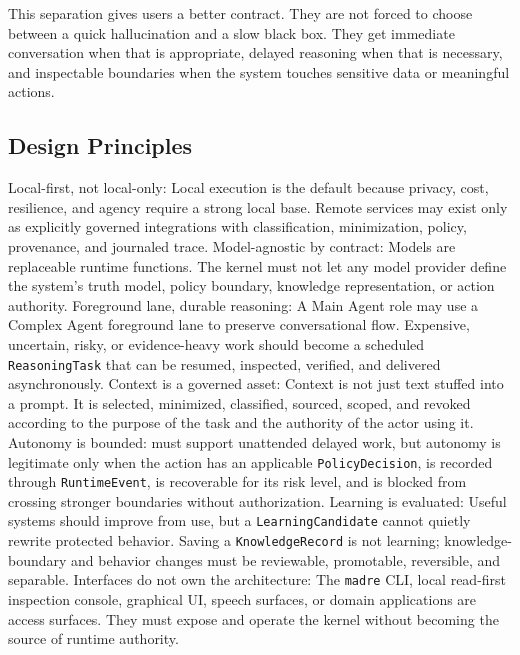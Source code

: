 \documentclass[11pt]{report}
\begin{document}
This separation gives users a better contract. They are not forced to choose between a quick hallucination and a slow black box. They get immediate conversation when that is appropriate, delayed reasoning when that is necessary, and inspectable boundaries when the system touches sensitive data or meaningful actions.

\subsection{Design Principles}

\begin{itemize}
	\itembf Local-first, not local-only: Local execution is the default because privacy, cost, resilience, and agency require a strong local base. Remote services may exist only as explicitly governed integrations with classification, minimization, policy, provenance, and journaled trace.
	\itembf Model-agnostic by contract: Models are replaceable runtime functions. The kernel must not let any model provider define the system's truth model, policy boundary, knowledge representation, or action authority.
	\itembf Foreground lane, durable reasoning: A Main Agent role may use a Complex Agent foreground lane to preserve conversational flow. Expensive, uncertain, risky, or evidence-heavy work should become a scheduled \texttt{ReasoningTask} that can be resumed, inspected, verified, and delivered asynchronously.
	\itembf Context is a governed asset: Context is not just text stuffed into a prompt. It is selected, minimized, classified, sourced, scoped, and revoked according to the purpose of the task and the authority of the actor using it.
	\itembf Autonomy is bounded: \Madre must support unattended delayed work, but autonomy is legitimate only when the action has an applicable \texttt{PolicyDecision}, is recorded through \texttt{RuntimeEvent}, is recoverable for its risk level, and is blocked from crossing stronger boundaries without authorization.
	\itembf Learning is evaluated: Useful systems should improve from use, but a \texttt{LearningCandidate} cannot quietly rewrite protected behavior. Saving a \texttt{KnowledgeRecord} is not learning; knowledge-boundary and behavior changes must be reviewable, promotable, reversible, and separable.
	\itembf Interfaces do not own the architecture:	The \texttt{madre} CLI, local read-first inspection console, graphical UI, speech surfaces, or domain applications are access surfaces. They must expose and operate the kernel without becoming the source of runtime authority.
\end{itemize}
\end{document}
